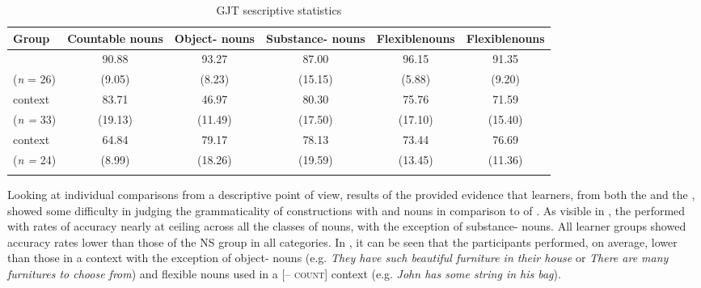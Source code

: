 \documentclass[output=paper]{langsci/langscibook}
\begin{document}
\begin{table}
\caption{GJT sescriptive statistics}
\label{tab:thomas:6}
\small
\begin{tabularx}{\textwidth}{QSSSSS}
\lsptoprule
\bfseries Group &
\bfseries Countable nouns & 
\bfseries Object- nouns & 
\bfseries Substance- nouns & 
\bfseries Flexible nouns & 
\bfseries Flexible nouns\\
\midrule
{} & 90.88 & 93.27 & {87.00} & {96.15} & 91.35\\
(\textit{n} = 26) & (9.05) & (8.23) & {(15.15)} & {(5.88)} & (9.20)\\
 context & 83.71 & 46.97 & {80.30} & {75.76} & 71.59\\
(\textit{n =} 33) & (19.13) & (11.49) & {(17.50)} & {(17.10)} & (15.40)\\
 context & 64.84 & 79.17 & {78.13} & {73.44} & 76.69\\
(\textit{n =} 24) & (8.99) & (18.26) & {(19.59)} & {(13.45)} & (11.36)\\
\lspbottomrule
\end{tabularx}
\end{table}

Looking at individual comparisons from a descriptive point of view, results of the  provided evidence that   learners, from both the  and the , showed some difficulty in judging the grammaticality of constructions with  and  nouns in comparison to  of . As visible in , the  performed with rates of accuracy nearly at ceiling across all the classes of nouns, with the exception of substance- nouns. All learner groups  showed accuracy rates lower than those of the NS group in all categories. In , it can be seen that the  participants performed, on average, lower than those in a  context with the exception of object- nouns (e.g. \textit{They have such beautiful furniture in their house} or \textit{There are many furnitures to choose from}) and flexible nouns used in a [\textsc{– count}] context (e.g. \textit{John has some string in his bag}). 
\end{document}
